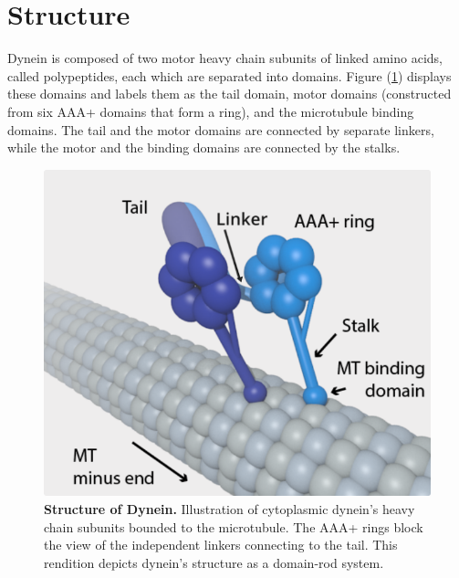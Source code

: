 \section{Structure}

Dynein is composed of two motor heavy chain subunits of linked amino acids, called polypeptides, each which are separated into domains. Figure (\ref{fig:structure}) displays these domains and labels them as the tail domain, motor domains (constructed from six AAA+ domains that form a ring), and the microtubule binding domains. The tail and the motor domains are connected by separate linkers, while the motor and the binding domains are connected by the stalks.


\begin{figure}[H]
	\centering
	\includegraphics[width=0.6\columnwidth]{Figures/dynein_on_MT.png}
	\caption[Structure of Dynein]{\textbf{Structure of Dynein.} Illustration of cytoplasmic dynein's heavy chain subunits bounded to the microtubule. The AAA+ rings block the view of the independent linkers connecting to the tail. This rendition depicts dynein’s structure as a domain-rod system. \cite{TheTrappistArt}}
	\label{fig:structure}
\end{figure}

